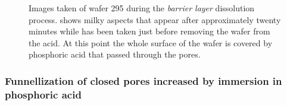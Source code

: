 \documentclass[../thesis.tex]{subfiles}
\begin{document}
          \begin{figure}[htpb]
            \centering
            \hfill
            \caption{Images taken of wafer 295 during the \textit{barrier layer} dissolution process. \protect{} shows milky aspects that appear after approximately twenty minutes while \protect{} has been taken just before removing the wafer from the acid. At this point the whole surface of the wafer is covered by phosphoric acid that passed through the pores.}
            \label{fig:barrier-layer-diss-images}
          \end{figure}


            \subsubsection{Funnellization of closed pores increased by immersion in phosphoric acid}
            \label{subsec:immersion-experiment}
\end{document}
